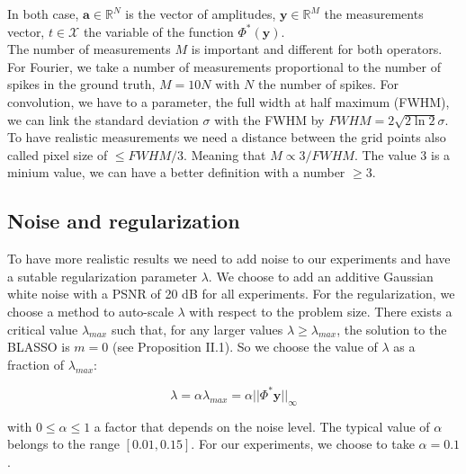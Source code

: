 \documentclass[a4paper,12pt,oneside]{report}
\theoremstyle{named}
\begin{document}
In both case, $\mathbf{a} \in \mathbb{R}^N$ is the vector of amplitudes, $\mathbf{y} \in \mathbb{R}^M$ the measurements vector, $t \in \mathcal{X}$ the variable of the function $\Phi^* (\mathbf{y})$.\\

The number of measurements $M$ is important and different for both operators. For Fourier, we take a number of measurements proportional to the number of spikes in the ground truth, $M = 10 N$ with $N$ the number of spikes. For convolution, we have to a parameter, the full width at half maximum (FWHM), we can link the standard deviation $\sigma$ with the FWHM by $FWHM = 2 \sqrt{2\ln2} \sigma$. To have realistic measurements we need a distance between the grid points also called pixel size of $\leq FWHM / 3$. Meaning that $M \propto 3 / FWHM$. The value 3 is a minium value, we can have a better definition with a number $\geq 3$.

\subsection{Noise and regularization}
To have more realistic results we need to add noise to our experiments and have a sutable regularization parameter $\lambda$. We choose to add an additive Gaussian white noise with a PSNR of 20 dB for all experiments. For the regularization, we choose a method to auto-scale $\lambda$ with respect to the problem size. There exists a critical value $\lambda_{max}$ such that, for any larger values $\lambda \geq \lambda_{max}$, the solution to the BLASSO is $m=0$ (see \cite{9258416} Proposition II.1). So we choose the value of $\lambda$ as a fraction of $\lambda_{max}$: 

\begin{equation}
    \lambda = \alpha \lambda_{max}= \alpha ||\Phi^*\mathbf{y}||_\infty
\end{equation}

with $ 0 \leq \alpha \leq 1$ a factor that depends on the noise level. The typical value of $\alpha$ belongs to the range $[0.01, 0.15]$.
For our experiments, we choose to take $\alpha = 0.1$.
\end{document}
